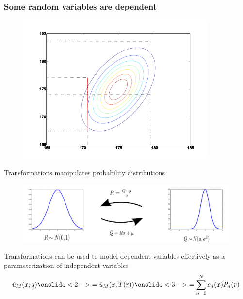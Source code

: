 \documentclass[handout]{beamer}
\begin{document}
\begin{frame}
 \frametitle{Some random variables are dependent}
 \begin{figure}
 \includegraphics[width = 0.9\textwidth]{dependent.png}
 \end{figure}

 \end{frame}



\begin{frame}{Transformations manipulates probability distributions}
\begin{figure}
 \includegraphics[width=\textwidth]{trans2.png}
\end{figure}
\end{frame}



\begin{frame}{Transformations can be used to model dependent
    variables effectively as a parameterization of independent
    variables}{}
    \begin{align*}
        \hat u_M(x; q)
        \onslide<2->{= \hat u_M(x; T(r))}
        \onslide<3->{= \sum_{n=0}^N c_n(x) P_n(r)}
    \end{align*}
\end{frame}
\end{document}
